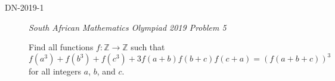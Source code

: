 \documentclass{article}
\begin{document}
\begin{description}
    \item[DN-2019-1] \textit{South African Mathematics Olympiad 2019 Problem 5}

    Find all functions $f : \mathbb{Z} \to \mathbb{Z}$ such that
    \[
        f\left(a^3\right) + f\left(b^3\right) + f\left(c^3\right) + 3f(a + b) f(b + c) f(c + a) = {\left(f(a + b + c)\right)}^3    
    \]
    for all integers $a$, $b$, and $c$.
\end{description}
\end{document}
